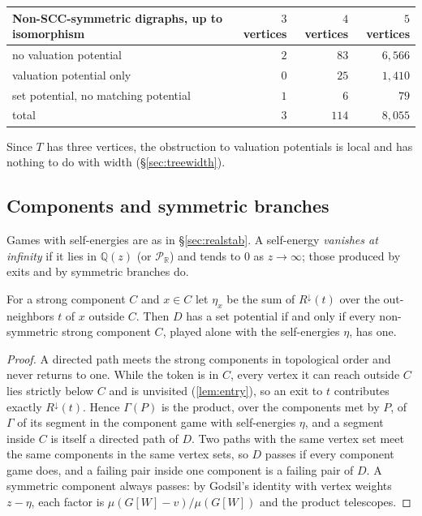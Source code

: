 \documentclass[final]{siamart0516}
\numberwithin{theorem}{section}
\numberwithin{equation}{section}
\theoremstyle{siamnonum}
\theoremstyle{plain}
\newcommand{\QQ}{\mathbb{Q}}
\newcommand{\RR}{\mathbb{R}}
\newcommand{\Qz}{\QQ(z)}
\newcommand{\Puis}{\mathcal{P}_{\RR}}
\newcommand{\Rdown}{R^{\downarrow}}
\begin{document}
\begin{center}\small
\begin{tabular}{@{}lrrr@{}}
\toprule
Non-SCC-symmetric digraphs, up to isomorphism & $3$ vertices & $4$ vertices & $5$ vertices\\ \midrule
no valuation potential & $2$ & $83$ & $6{,}566$\\
valuation potential only & $0$ & $25$ & $1{,}410$\\
set potential, no matching potential & $1$ & $6$ & $79$\\ \midrule
total & $3$ & $114$ & $8{,}055$\\
\bottomrule
\end{tabular}
\end{center}
Since $T$ has three vertices, the obstruction to valuation potentials is local and has nothing to do with width (\S\ref{sec:treewidth}).

\subsection{Components and symmetric branches}
Games with self-energies are as in \S\ref{sec:realstab}. A self-energy \emph{vanishes at infinity} if it lies in $\Qz$ (or $\Puis$) and tends to $0$ as $z\to\infty$; those produced by exits and by symmetric branches do.

\begin{lemma}[components]\label{lem:set-components}
For a strong component $C$ and $x\in C$ let $\eta_x$ be the sum of $\Rdown(t)$ over the out-neighbors $t$ of $x$ outside $C$. Then $D$ has a set potential if and only if every non-symmetric strong component $C$, played alone with the self-energies $\eta$, has one.
\end{lemma}
\begin{proof}
A directed path meets the strong components in topological order and never returns to one. While the token is in $C$, every vertex it can reach outside $C$ lies strictly below $C$ and is unvisited (\cref{lem:entry}), so an exit to $t$ contributes exactly $\Rdown(t)$. Hence $\Gamma(P)$ is the product, over the components met by $P$, of $\Gamma$ of its segment in the component game with self-energies $\eta$, and a segment inside $C$ is itself a directed path of $D$. Two paths with the same vertex set meet the same components in the same vertex sets, so $D$ passes if every component game does, and a failing pair inside one component is a failing pair of $D$. A symmetric component always passes: by Godsil's identity with vertex weights $z-\eta$, each factor is $\mu(G[W]-v)/\mu(G[W])$ and the product telescopes.
\end{proof}
\end{document}
